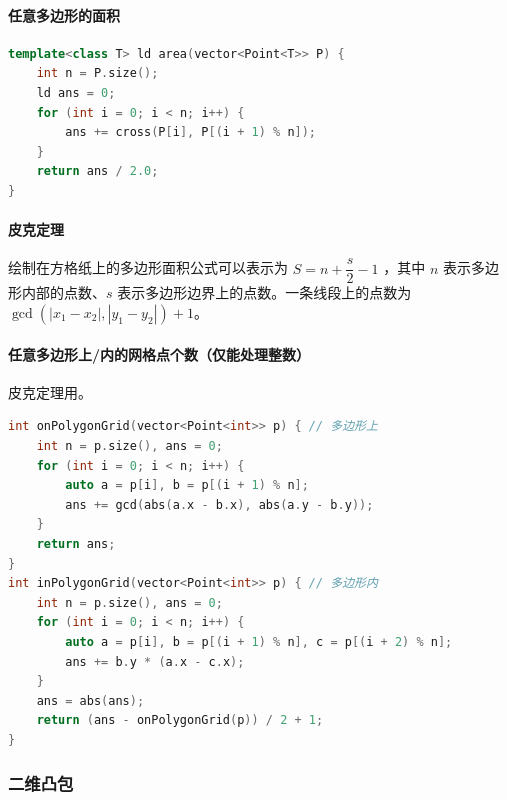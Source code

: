 \hypertarget{ux4efbux610fux591aux8fb9ux5f62ux7684ux9762ux79ef}{%
\paragraph{任意多边形的面积}\label{ux4efbux610fux591aux8fb9ux5f62ux7684ux9762ux79ef}}

\begin{lstlisting}[language={C++}]
template<class T> ld area(vector<Point<T>> P) {
    int n = P.size();
    ld ans = 0;
    for (int i = 0; i < n; i++) {
        ans += cross(P[i], P[(i + 1) % n]);
    }
    return ans / 2.0;
}
\end{lstlisting}

\hypertarget{ux76aeux514bux5b9aux7406}{%
\paragraph{皮克定理}\label{ux76aeux514bux5b9aux7406}}

绘制在方格纸上的多边形面积公式可以表示为 \(S=n+\dfrac{s}{2}-1\) ，其中 \(n\) 表示多边形内部的点数、\(s\) 表示多边形边界上的点数。一条线段上的点数为 \(\gcd(|x_1-x_2|,|y_1-y_2|)+1\)。

\hypertarget{ux4efbux610fux591aux8fb9ux5f62ux4e0aux5185ux7684ux7f51ux683cux70b9ux4e2aux6570ux4ec5ux80fdux5904ux7406ux6574ux6570}{%
\paragraph{任意多边形上/内的网格点个数（仅能处理整数）}\label{ux4efbux610fux591aux8fb9ux5f62ux4e0aux5185ux7684ux7f51ux683cux70b9ux4e2aux6570ux4ec5ux80fdux5904ux7406ux6574ux6570}}

皮克定理用。

\begin{lstlisting}[language={C++}]
int onPolygonGrid(vector<Point<int>> p) { // 多边形上
    int n = p.size(), ans = 0;
    for (int i = 0; i < n; i++) {
        auto a = p[i], b = p[(i + 1) % n];
        ans += gcd(abs(a.x - b.x), abs(a.y - b.y));
    }
    return ans;
}
int inPolygonGrid(vector<Point<int>> p) { // 多边形内
    int n = p.size(), ans = 0;
    for (int i = 0; i < n; i++) {
        auto a = p[i], b = p[(i + 1) % n], c = p[(i + 2) % n];
        ans += b.y * (a.x - c.x);
    }
    ans = abs(ans);
    return (ans - onPolygonGrid(p)) / 2 + 1;
}
\end{lstlisting}

\hypertarget{ux4e8cux7ef4ux51f8ux5305}{%
\subsubsection{二维凸包}\label{ux4e8cux7ef4ux51f8ux5305}}

